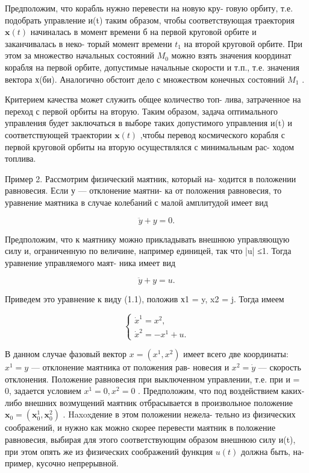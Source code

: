 \documentclass[8pt]{extarticle}
\begin{document}
Предположим, что корабль нужно перевести на новую кру- говую орбиту, т.е. подобрать управление и(t) таким образом, чтобы соответствующая траектория \(\mathbf{x}\left( t\right)\) начиналась в момент времени б на первой круговой орбите и заканчивалась в неко- торый момент времени \({t}_{1}\) на второй круговой орбите. При этом за множество начальных состояний \({M}_{0}\) можно взять значения координат корабля на первой орбите, допустимые начальные скорости и т.п., т.е. значения вектора х(би). Аналогично обстоит дело с множеством конечных состояний \({M}_{1}\) .

Критерием качества может служить общее количество топ- лива, затраченное на переход с первой орбиты на вторую. Таким образом, задача оптимального управления будет заключаться в выборе таких допустимого управления и(t) и соответствующей траектории \(\mathbf{x}\left( t\right)\) ,чтобы перевод космического корабля с первой круговой орбиты на вторую осуществлялся с минимальным рас- ходом топлива.

Пример 2. Рассмотрим физический маятник, который на- ходится в положении равновесия. Если у — отклонение маятни- ка от положения равновесия, то уравнение маятника в случае колебаний с малой амплитудой имеет вид

\[
\ddot{y} + y = 0.
\]

Предположим, что к маятнику можно прикладывать внешнюю управляющую силу и, ограниченную по величине, например единицей, так что |u| ≤1. Тогда уравнение управляемого маят- ника имеет вид

\[
\ddot{y} + y = u.
\]

Приведем это уравнение к виду (1.1), положив х1 = y, x2 = j. Тогда имеем

\[
\left\{  \begin{array}{l} {\dot{x}}^{1} = {x}^{2}, \\  {\dot{x}}^{2} =  - {x}^{1} + u. \end{array}\right. \tag{1.5}
\]

В данном случае фазовый вектор \(x = \left( {{x}^{1},{x}^{2}}\right)\) имеет всего две координаты: \({x}^{1} = y\) — отклонение маятника от положения рав- новесия и \({x}^{2} = \dot{y}\) — скорость отклонения. Положение равновесия при выключенном управлении, т.е. при и = 0, задается условием \({x}^{1} = 0,{x}^{2} = 0\) . Предположим, что под воздействием каких-либо внешних возмущений маятник отбрасывается в произвольное положение \({\mathbf{x}}_{0} = \left( {{\mathbf{x}}_{0}^{1},{\mathbf{x}}_{0}^{2}}\right)\) . Haxoxдение в этом положении нежела- тельно из физических соображений, и нужно как можно скорее перевести маятник в положение равновесия, выбирая для этого соответствующим образом внешнюю силу и(t), при этом опять же из физических соображений функция \(u\left( t\right)\) должна быть, на- пример, кусочно непрерывной.
\end{document}
